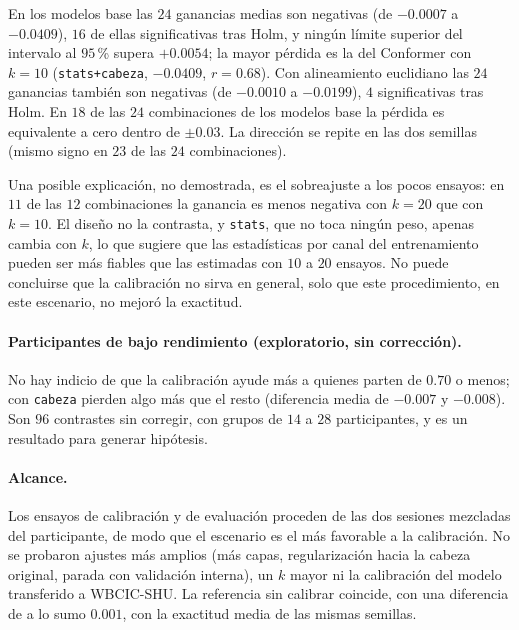 En los modelos base las $24$ ganancias medias son negativas (de $-0.0007$ a $-0.0409$), $16$ de ellas
significativas tras Holm, y ningún límite superior del intervalo al $95$\,\% supera $+0.0054$; la mayor
pérdida es la del Conformer con $k = 10$ (\texttt{stats+cabeza}, $-0.0409$, $r = 0.68$). Con alineamiento
euclidiano las $24$ ganancias también son negativas (de $-0.0010$ a $-0.0199$), $4$ significativas tras Holm.
En $18$ de las $24$ combinaciones de los modelos base la pérdida es equivalente a cero dentro de $\pm 0.03$.
La dirección se repite en las dos semillas (mismo signo en $23$ de las $24$ combinaciones).

Una posible explicación, no demostrada, es el sobreajuste a los pocos ensayos: en $11$ de las $12$
combinaciones la ganancia es menos negativa con $k = 20$ que con $k = 10$. El diseño no la contrasta, y
\texttt{stats}, que no toca ningún peso, apenas cambia con $k$, lo que sugiere que las estadísticas por canal
del entrenamiento pueden ser más fiables que las estimadas con $10$ a $20$ ensayos. No puede concluirse que
la calibración no sirva en general, solo que este procedimiento, en este escenario, no mejoró la exactitud.

\paragraph{Participantes de bajo rendimiento (exploratorio, sin corrección).} No hay indicio de que la
calibración ayude más a quienes parten de $0.70$ o menos; con \texttt{cabeza} pierden algo más que el resto
(diferencia media de $-0.007$ y $-0.008$). Son $96$ contrastes sin corregir, con grupos de $14$ a $28$
participantes, y es un resultado para generar hipótesis.

\paragraph{Alcance.} Los ensayos de calibración y de evaluación proceden de las dos sesiones mezcladas del
participante, de modo que el escenario es el más favorable a la calibración. No se probaron ajustes más
amplios (más capas, regularización hacia la cabeza original, parada con validación interna), un $k$ mayor ni
la calibración del modelo transferido a WBCIC-SHU. La referencia sin calibrar coincide, con una diferencia de
a lo sumo $0.001$, con la exactitud \loso{} media de las mismas semillas.


